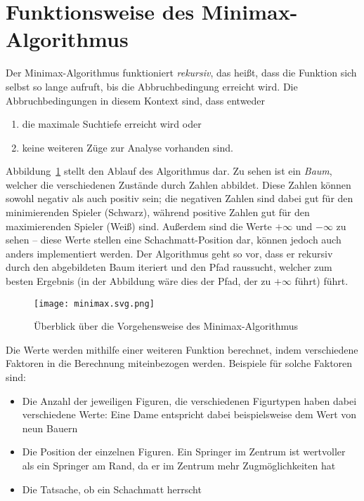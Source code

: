 \section{Funktionsweise des Minimax-Algorithmus}
Der Minimax-Algorithmus funktioniert \textit{rekursiv}, das heißt, dass die Funktion sich selbst so lange aufruft, bis die Abbruchbedingung erreicht wird. Die Abbruchbedingungen in diesem Kontext sind, dass entweder 

\begin{enumerate}
    \item die maximale Suchtiefe erreicht wird oder
    \item keine weiteren Züge zur Analyse vorhanden sind.
\end{enumerate}

Abbildung~\ref{fig:minimax} stellt den Ablauf des Algorithmus dar. Zu sehen ist ein \textit{Baum}, welcher die verschiedenen Zustände durch Zahlen abbildet. Diese Zahlen können sowohl negativ als auch positiv sein; die negativen Zahlen sind dabei gut für den minimierenden Spieler (Schwarz), während positive Zahlen gut für den maximierenden Spieler (Weiß) sind. Außerdem sind die Werte $+\infty$ und $-\infty$ zu sehen -- diese Werte stellen eine Schachmatt-Position dar, können jedoch auch anders implementiert werden. Der Algorithmus geht so vor, dass er rekursiv durch den abgebildeten Baum iteriert und den Pfad raussucht, welcher zum besten Ergebnis (in der Abbildung wäre dies der Pfad, der zu $+\infty$ führt) führt.

\begin{figure}[H]
	\texttt{[image: minimax.svg.png]}
	\caption{Überblick über die Vorgehensweise des Minimax-Algorithmus\footnotemark}
	\label{fig:minimax}
\end{figure}

Die Werte werden mithilfe einer weiteren Funktion berechnet, indem verschiedene Faktoren in die Berechnung miteinbezogen werden. Beispiele für solche Faktoren sind:

\begin{itemize}
    \item Die Anzahl der jeweiligen Figuren, die verschiedenen Figurtypen haben dabei verschiedene Werte: Eine Dame entspricht dabei beispielsweise dem Wert von neun Bauern
    \item Die Position der einzelnen Figuren. Ein Springer im Zentrum ist wertvoller als ein Springer am Rand, da er im Zentrum mehr Zugmöglichkeiten hat
    \item Die Tatsache, ob ein Schachmatt herrscht
\end{itemize}

